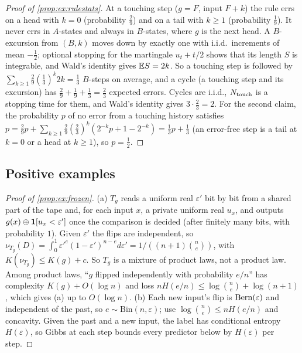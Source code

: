 \begin{proof}[Proof of \cref{prop:ex:rulestats}]
At a touching step ($g=F$, input $F+k$) the rule errs on a head with $k=0$ (probability $\frac29$) and on a tail with $k\ge1$ (probability $\frac19$). It never errs in $A$-states and always in $B$-states, where $g$ is the next head. A $B$-excursion from $(B,k)$ moves down by exactly one with i.i.d.\ increments of mean $-\frac12$; optional stopping for the martingale $u_t+t/2$ shows that its length $S$ is integrable, and Wald's identity gives $\mathbb{E} S=2k$. So a touching step is followed by $\sum_{k\ge1}\frac29(\frac13)^k2k=\frac13$ $B$-steps on average, and a cycle (a touching step and its excursion) has $\frac29+\frac19+\frac13=\frac23$ expected errors. Cycles are i.i.d., $N_{\rm touch}$ is a stopping time for them, and Wald's identity gives $3\cdot\frac23=2$. For the second claim, the probability $p$ of no error from a touching history satisfies $p=\frac29p+\sum_{k\ge1}\frac29(\frac23)^k(2^{-k}p+1-2^{-k})=\frac13p+\frac13$ (an error-free step is a tail at $k=0$ or a head at $k\ge1$), so $p=\frac12$.
\end{proof}

\subsection{Positive examples}\label{app:ex:positive}

\begin{proof}[Proof of \cref{prop:ex:frozen}]
(a) $T_g$ reads a uniform real $\varepsilon'$ bit by bit from a shared part of the tape and, for each input $x$, a private uniform real $u_x$, and outputs $g(x)\oplus\mathbf{1}[u_x<\varepsilon']$ once the comparison is decided (after finitely many bits, with probability $1$). Given $\varepsilon'$ the flips are independent, so $\nu_{T_g}(D)=\int_0^1\varepsilon'^e(1-\varepsilon')^{n-e}d\varepsilon'=1/((n+1)\binom ne)$, with $K(\nu_{T_g})\le K(g)+c$. So $T_g$ is a mixture of product laws, not a product law. Among product laws, ``$g$ flipped independently with probability $e/n$'' has complexity $K(g)+O(\log n)$ and loss $nH(e/n)\le\log\binom ne+\log(n+1)$, which gives (a) up to $O(\log n)$.
(b) Each new input's flip is $\operatorname{Bern}(\varepsilon)$ and independent of the past, so $e\sim\mathrm{Bin}(n,\varepsilon)$; use $\log\binom ne\le nH(e/n)$ and concavity. Given the past and a new input, the label has conditional entropy $H(\varepsilon)$, so Gibbs at each step bounds every predictor below by $H(\varepsilon)$ per step.
\end{proof}

